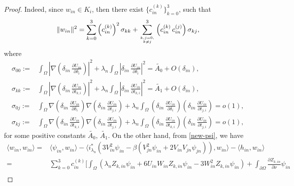 \documentclass[10pt,a4paper]{amsart}
\begin{document}
\begin{proof}
Indeed, since $w_{in}\in K_i$, then there exist $\{c_{in}^{(k)}\}_{k=0}^{3}$, such that 
\begin{align}
    \label{w-1}\|w_{in}\|^2=\sum_{k=0}^3\left(c_{in}^{(k)}\right)^2\sigma_{kk}+\sum_{k,j=0,\atop k\neq j}^3\left(c_{in}^{(k)}\,c_{in}^{(j)}\right)\sigma_{kj},
\end{align}
where
\begin{align}\label{useful}
\sigma_{00}:=&\displaystyle\int_{\Omega}\left|\nabla\left(\delta_{in}\,\frac{\partial U_{in}}{\partial \delta_i}\right)\right|^2+\lambda_n\displaystyle\int_{\Omega}\left|\delta_{in}\,\frac{\partial U_{in}}{\partial \delta_i}\right|^2=\widetilde{A_0}+O(\delta_{in}),\nonumber\\\sigma_{kk}:=&\displaystyle\int_{\Omega}\left|\nabla\left(\delta_{in}\,\frac{\partial U_{in}}{\partial t_{k,i}}\right)\right|^2+\lambda_n\displaystyle\int_{\Omega}\left|\delta_{in}\,\frac{\partial U_{in}}{\partial t_{k,i}}\right|^2=\widetilde{A_1}+O(\delta_{in}),\nonumber\\
\sigma_{0j}:=&\displaystyle\int_{\Omega}\nabla\left(\delta_{in}\,\frac{\partial U_{in}}{\partial\delta_{i}}\right)\nabla\left(\delta_{in}\,\frac{\partial U_{in}}{\partial t_{j,i}}\right)+\lambda_n\displaystyle\int_{\Omega}\left(\delta_{in}\,\frac{\partial U_{in}}{\partial \delta_{i}}\right)\left(\delta_{in}\,\frac{\partial U_{in}}{\partial t_{j,i}}\right)=o(1),\nonumber\\
\sigma_{kj}:=&\displaystyle\int_{\Omega}\nabla\left(\delta_{in}\,\frac{\partial U_{in}}{\partial t_{k,i}}\right)\nabla\left(\delta_{in}\,\frac{\partial U_{in}}{\partial t_{j,i}}\right)+\lambda_n\displaystyle\int_{\Omega}\left(\delta_{in}\,\frac{\partial U_{in}}{\partial t_{k,i}}\right)\left(\delta_{in}\,\frac{\partial U_{in}}{\partial t_{j,i}}\right)=o(1),
\end{align}
for some positive constants $\widetilde{A_0},\,\widetilde{A_1}$. On the other hand, from \eqref{new-psi}, we have 
\begin{align}
    \label{w-2}
  \langle w_{in},w_{in}\rangle=& \langle \psi_{in},w_{in}\rangle-\langle i_{\lambda_n}^{*}\left(3V_{in}^2\psi_{in}-\beta\left(V_{jn}^2\psi_{in}+2V_{in}V_{jn}\psi_{jn}\right)\right),w_{in}\rangle-\langle h_{in},w_{in}\rangle\nonumber\\
  =&\sum_{k=0}^3c_{in}^{(k)}\Bigg[\displaystyle\int_{\Omega}\left(\lambda_n Z_{k,in}\psi_{in}+6U_{in}W_{in}Z_{k,in}\psi_{in}-3W^2_{in}Z_{k,in}\psi_{in}\right)+\displaystyle\int_{\partial\Omega}\frac{\partial Z_{k,in}}{\partial \nu}\psi_{in}\nonumber\\

\end{align}
\end{proof}
\end{document}
